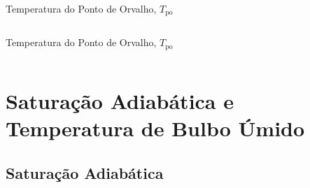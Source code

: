     \begin{frame}{Temperatura do Ponto de Orvalho, $T_{\mathrm{po}}$}\vspace*{-2em}
        \begin{columns}
        \end{columns}
    \end{frame}

    \begin{frame}{Temperatura do Ponto de Orvalho, $T_{\mathrm{po}}$}\vspace*{-2em}
        \begin{columns}
        \end{columns}
    \end{frame}

\section{Saturação Adiabática e Temperatura de Bulbo Úmido}

\subsection{Saturação Adiabática}

